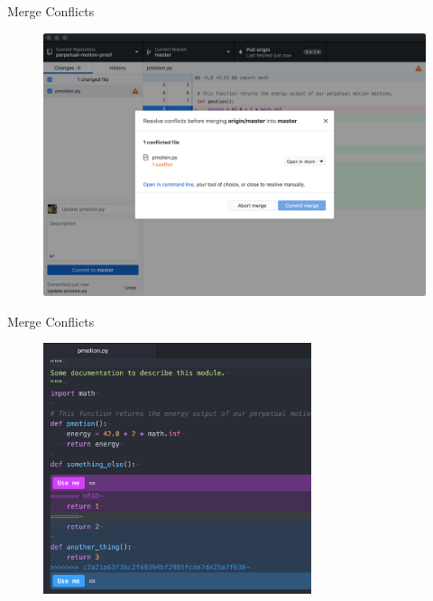 \documentclass{beamer}
\begin{document}
    \begin{frame}{Merge Conflicts}
        \begin{figure}
            \centering
            \includegraphics[width=\textwidth]{figures/merge_2.png}
        \end{figure}
    \end{frame}

    \begin{frame}{Merge Conflicts}
        \begin{figure}
            \centering
            \includegraphics[width=0.7\textwidth]{figures/merge_3.png}
        \end{figure}
    \end{frame}
\end{document}
